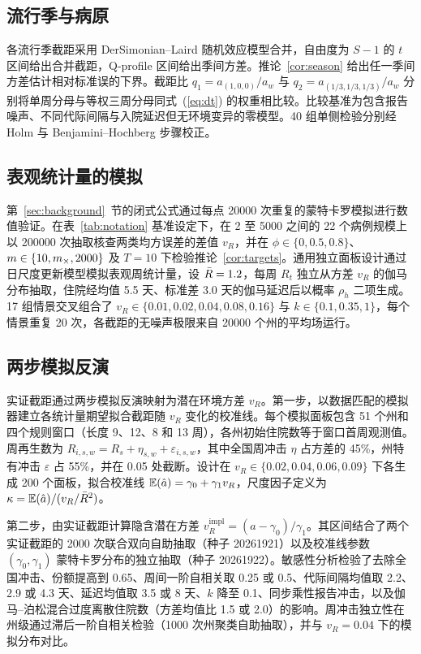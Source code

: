 \subsection{流行季与病原}
\label{sec:meth-seasons}

各流行季截距采用 DerSimonian--Laird 随机效应模型合并\citep{dersimonian1986meta}，自由度为 $S-1$ 的 $t$ 区间给出合并截距，Q-profile 区间给出季间方差\citep{viechtbauer2007confidence}。推论~\ref{cor:season} 给出任一季间方差估计相对标准误的下界\citep{searle1992variance}。截距比 $q_1=a_{(1,0,0)}/a_{w}$ 与 $q_2=a_{(1/3,1/3,1/3)}/a_{w}$ 分别将单周分母与等权三周分母同式~(\ref{eq:dt}) 的权重相比较。比较基准为包含报告噪声、不同代际间隔与入院延迟但无环境变异的零模型。40 组单侧检验分别经 Holm 与 Benjamini--Hochberg 步骤校正\citep{holm1979simple, benjamini1995controlling}。

\subsection{表观统计量的模拟}
\label{sec:meth-sim}

第~\ref{sec:background}~节的闭式公式通过每点 20000 次重复的蒙特卡罗模拟进行数值验证。在表~\ref{tab:notation} 基准设定下，在 2 至 5000 之间的 22 个病例规模上以 200000 次抽取核查两类均方误差的差值 $v_R$，并在 $\phi\in\{0,0.5,0.8\}$、$m\in\{10,m_{\times},2000\}$ 及 $T=10$ 下检验推论~\ref{cor:targets}。通用独立面板设计通过日尺度更新模型模拟表观周统计量，设 $\bar{R}=1.2$，每周 $R_t$ 独立从方差 $v_R$ 的伽马分布抽取，住院经均值 5.5 天、标准差 3.0 天的伽马延迟后以概率 $\rho_h$ 二项生成。17 组情景交叉组合了 $v_R\in\{0.01,0.02,0.04,0.08,0.16\}$ 与 $k\in\{0.1,0.35,1\}$，每个情景重复 20 次，各截距的无噪声极限来自 20000 个州的平均场运行。

\subsection{两步模拟反演}
\label{sec:meth-inversion}

实证截距通过两步模拟反演映射为潜在环境方差 $v_R$。第一步，以数据匹配的模拟器建立各统计量期望拟合截距随 $v_R$ 变化的校准线。每个模拟面板包含 51 个州和四个规则窗口（长度 9、12、8 和 13 周），各州初始住院数等于窗口首周观测值。周再生数为 $R_{i,s,w}=R_s+\eta_{s,w}+\varepsilon_{i,s,w}$，其中全国周冲击 $\eta$ 占方差的 45\%，州特有冲击 $\varepsilon$ 占 55\%，并在 0.05 处截断。设计在 $v_R\in\{0.02,0.04,0.06,0.09\}$ 下各生成 200 个面板，拟合校准线 $\mathbb{E}(\hat{a})=\gamma_0+\gamma_1v_R$，尺度因子定义为 $\kappa=\mathbb{E}(\hat{a})/(v_R/\bar{R}^2)$。

第二步，由实证截距计算隐含潜在方差 $v_R^{\mathrm{impl}}=(a-\gamma_0)/\gamma_1$。其区间结合了两个实证截距的 2000 次联合双向自助抽取（种子 20261921）以及校准线参数 $(\gamma_0,\gamma_1)$ 蒙特卡罗分布的独立抽取（种子 20261922）。敏感性分析检验了去除全国冲击、份额提高到 0.65、周间一阶自相关取 0.25 或 0.5、代际间隔均值取 2.2、2.9 或 4.3 天、延迟均值取 3.5 或 8 天、$k$ 降至 0.1、同步乘性报告冲击，以及伽马--泊松混合过度离散住院数（方差均值比 1.5 或 2.0）的影响。周冲击独立性在州级通过滞后一阶自相关检验（1000 次州聚类自助抽取），并与 $v_R=0.04$ 下的模拟分布对比。
